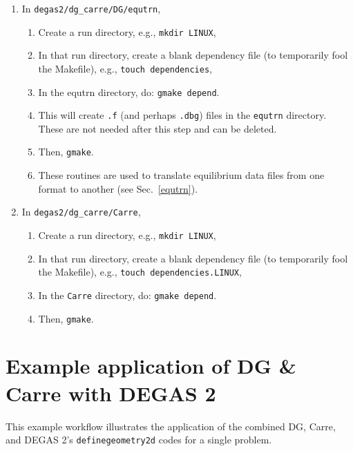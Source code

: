 \documentclass[12pt]{report}
\begin{document}
\begin{enumerate}
\begin{enumerate}
E.g.,
\verb+ln -s ../src/dg.dgh dg.dgh+
        \item Also in the run directory, create a link to the configuration
          file: \\
\verb+ln -s ../dg.dgc dg.dgc+
   \end{enumerate}
   \item In \verb+degas2/dg_carre/DG/equtrn+,
   \begin{enumerate}
        \item Create a run directory, e.g., \verb+mkdir LINUX+,
        \item In that run directory, create a blank dependency file (to 
          temporarily fool the Makefile), e.g., \verb+touch dependencies+,
        \item In the equtrn directory, do: \verb+gmake depend+.
        \item This will create \verb+.f+ (and perhaps \verb+.dbg+) 
files in the \verb+equtrn+ directory.  
These are not needed after this step and can be deleted.
        \item Then, \verb+gmake+.
        \item These routines are used to translate equilibrium data files from 
          one format to another (see Sec.~\ref{equtrn}).
   \end{enumerate}
   \item In \verb+degas2/dg_carre/Carre+,
   \begin{enumerate}
        \item Create a run directory, e.g., \verb+mkdir LINUX+,
        \item In that run directory, create a blank dependency file (to 
          temporarily fool the Makefile), e.g., 
\verb+touch dependencies.LINUX+,
        \item In the \verb+Carre+ directory, do: \verb+gmake depend+.
        \item Then, \verb+gmake+.
   \end{enumerate}
\end{enumerate}

\section{Example application of DG \& Carre with DEGAS 2}
\label{dgdegas2}

This example workflow illustrates the application of the combined
DG, Carre, and DEGAS 2's {\tt definegeometry2d} codes for a single
problem.
\end{document}
